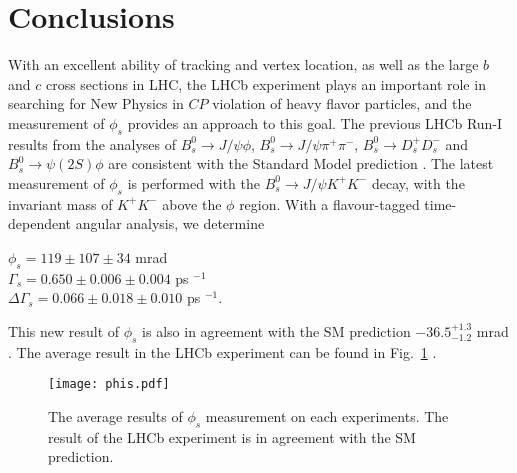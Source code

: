 \documentclass[10pt]{article}
\def\CP                {{\ensuremath{C\!P}}\xspace}
\begin{document}
 







\section{Conclusions}
With an excellent ability of tracking and vertex location, as well as the large $b$ and $c$ cross sections in LHC, the LHCb experiment plays an important role in searching for New Physics in \CP violation of heavy flavor particles, and the measurement of $\phi_s$ provides an approach to this goal. The previous LHCb Run-I results from the analyses of $B_s^0 \to J/\psi \phi$, $B_s^0 \to J/\psi \pi^+ \pi^-$, $B_s^0 \to D_s^+ D_s^-$ and $B_s^0 \to \psi(2S) \phi$ are consistent with the Standard Model prediction \cite{Aaij:2014zsa, Aaij:2014dka, Aaij:2014ywt, Aaij:2016ohx}. The latest measurement of $\phi_s$ is performed with the $B_s^0 \to J/\psi K^+ K^-$ decay, with the invariant mass of $K^+ K^-$ above the $\phi$ region. With a flavour-tagged time-dependent angular analysis, we determine 
\begin{center}
$\phi_s = 119 \pm 107 \pm 34$ mrad\\
$\Gamma_s =  0.650 \pm 0.006 \pm 0.004$ ps $^{-1}$\\
$\Delta \Gamma_s = 0.066 \pm 0.018 \pm 0.010$ ps $^{-1}$.
\end{center}
This new result of $\phi_s$ is also in agreement with the SM prediction $-36.5^{+1.3}_{-1.2}$ mrad \cite{Charles:2015gya}. The average result in the LHCb experiment can be found in Fig.~\ref{fig:ave} \cite{Amhis:2016xyh}.

\begin{figure}[htb]
\centering
\texttt{[image: phis.pdf]}
\caption{The average results of $\phi_s$ measurement on each experiments. The result of the LHCb experiment is in agreement with the SM prediction.}
\label{fig:ave}
\end{figure}


\clearpage
\end{document}
